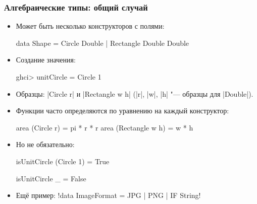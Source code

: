 \documentclass[10pt]{beamer}
\begin{document}
\begin{frame}[fragile]
  \frametitle{Алгебраические типы: общий случай}
  \begin{itemize}
    \item Может быть несколько конструкторов с полями:
          \begin{haskell}
            data Shape = Circle Double | Rectangle Double Double
          \end{haskell}
    \item Создание значения:
          \begin{haskell}
ghci> unitCircle = Circle 1
\end{haskell}
    \item Образцы: \haskinline|Circle r| и \haskinline|Rectangle w h| (\haskinline|r|, \haskinline|w|, \haskinline|h| "--- образцы для \haskinline|Double|).
    \item Функции часто определяются по уравнению на каждый конструктор:
          \begin{haskell}
            area (Circle r) = pi * r * r
            area (Rectangle w h) = w * h
          \end{haskell}
          \pause
    \item Но не обязательно:
          \begin{haskell}
            isUnitCircle (Circle 1) = True

            isUnitCircle _ = False
          \end{haskell}
          \pause
    \item Ещё пример: \haskinline!data ImageFormat = JPG | PNG | IF String!
  \end{itemize}
\end{frame}
\end{document}
